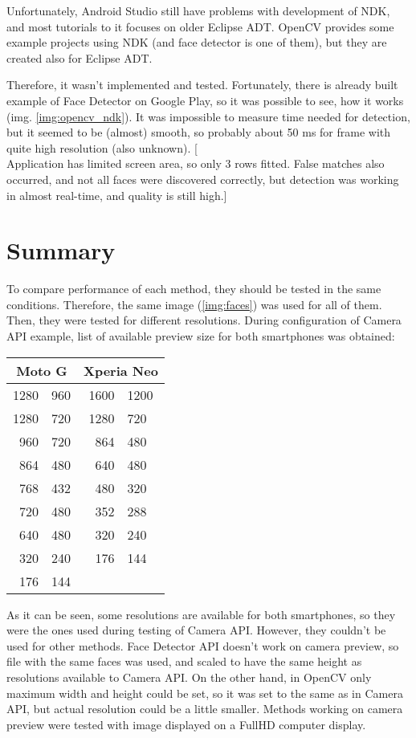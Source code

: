 Unfortunately, Android Studio still have problems with development of NDK, and
most tutorials to it focuses on older Eclipse ADT. 
OpenCV provides some example projects using NDK (and face detector is one of
them), but they are created also for Eclipse ADT.

Therefore, it wasn't implemented and tested. 
Fortunately, there is already built example of Face Detector on Google Play, so
it was possible to see, how it works (img. \ref{img:opencv_ndk}). 
It was impossible to measure time needed for
detection, but it seemed to be (almost) smooth, so probably about 50 ms for
frame with quite high resolution (also unknown).
[\\Application has limited screen area, so only 3 rows fitted. False matches
also occurred, and not all faces were discovered correctly, but detection was
working in almost real-time, and quality is still high.]

\section{Summary}
To compare performance of each method, they should be tested in the same
conditions. 
Therefore, the same image (\ref{img:faces}) was used for all of them.
Then, they were tested for different resolutions.
During configuration of Camera API example, list of available preview size for
both smartphones was obtained:
\begin{center}
\begin{tabular}{r@{ x }l|r@{ x }l}
\multicolumn{2}{c|}{Moto G} & \multicolumn{2}{c}{Xperia Neo} \\
\hline
1280 & 960 & 1600 & 1200 \\
1280 & 720 & 1280 & 720 \\
960 & 720 & 864 & 480 \\
864 & 480 & 640 & 480 \\
768 & 432 & 480 & 320 \\
720 & 480 & 352 & 288 \\
640 & 480 & 320 & 240 \\
320 & 240 & 176 & 144 \\
176 & 144 \\
\end{tabular}
\end{center}
As it can be seen, some resolutions are available for both smartphones, so they
were the ones used during testing of Camera API. 
However, they couldn't be used for other methods.
Face Detector API doesn't work on camera preview, so file with the same faces
was used, and scaled to have the same height as resolutions available to Camera API. 
On the other hand, in OpenCV only maximum width and height could be set, so it
was set to the same as in Camera API, but actual resolution could be a little
smaller.
Methods working on camera preview were tested with image displayed on a FullHD
computer display.

